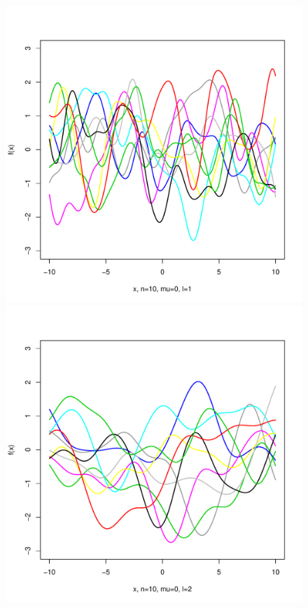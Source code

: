 \documentclass[12pt,letterpaper]{article}
\begin{document}
\begin{figure}
\begin{center}
\includegraphics[scale=0.2]{hw321/n10-m0-l1.pdf}
\includegraphics[scale=0.2]{hw321/n10-m0-l2.pdf}

\end{center}
\end{figure}
\end{document}
